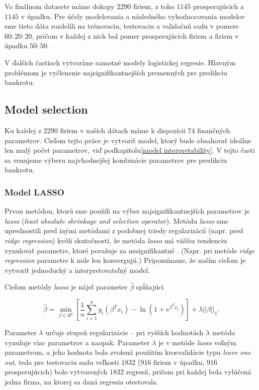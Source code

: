 Vo finálnom datasete máme dokopy \(2290\) firiem, z toho \(1145\) prosperujúcich a \(1145\) v úpadku.
Pre účely modelovania a následného vyhodnocovania modelov sme tieto dáta rozdelili na trénovaciu, testovaciu a validačnú sadu v pomere \(60:20:20\),
pričom v každej z nich bol pomer prosperujúcich firiem a firiem v úpadku \(50:50\).

V ďalších častiach vytvoríme samotné modely logistickej regresie. Hlavným problémom je vyčlenenie najsignifikantnejších premenných pre predikciu bankrotu.

\subsection{Model selection}

Ku každej z \(2290\) firiem v našich dátach máme k dispozícii \(74\) finančných parametrov.
Cieľom tejto práce je vytvoriť model, ktorý bude obsahovať ideálne len malý počet parametrov, viď podkapitolu\autoref{model interpretability}.
V tejto časti sa venujeme výberu najvhodnejšej kombinácie parametrov pre predikciu bankrotu.

\subsubsection{Model LASSO}

Prvou metódou, ktorú sme použili na výber najsignifikantnejších parametrov je \emph{lasso} (\emph{least absolute shrinkage and selection operator}).
Metódu \emph{lasso} sme uprednostili pred inými metódami z podobnej triedy regularizácií (napr. pred \emph{ridge regression}) kvôli skutočnosti,
že metóda \emph{lasso} má väčšiu tendenciu vynulovať parametre, ktoré považuje za nesignifikantné \cite{glmnet}.
(Napr. pri metóde \emph{ridge regression} parametre k nule len konvergujú.)
Pripomíname, že naším cieľom je vytvoriť jednoduchý a interpretovateľný model.

Cieľom metódy \emph{lasso} je nájsť parameter \(\hat{\beta}\) spĺňajúci

\[
    \hat{\beta} = \min_{\beta \in R^k} \left[ \frac{1}{n} \sum_{i = 1}^n y_i (\beta^T x_i) - \ln{(1 + e^{\beta^T x_i})} \right] + \lambda || \beta ||_1.
\]

Parameter \(\lambda\) určuje stupeň regularizácie – pri vyšších hodnotách \(\lambda\) metóda vynuluje viac parametrov a naopak.
Parameter \(\lambda\) je v metóde \emph{lasso} voľným parametrom, a jeho hodnota bola zvolená použitím krosvalidácie typu \emph{leave one out},
teda pre testovaciu sadu veľkosti \(1832\) (\(916\) firiem v úpadku, \(916\) prosperujúcich) bolo vytvorených \(1832\) regresií,
pričom pri každej bola vylúčená jedna firma, na ktorej sa daná regresia otestovala.

